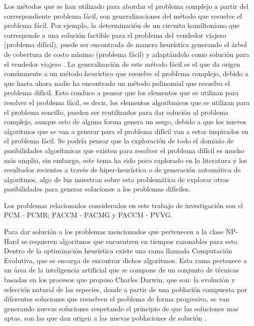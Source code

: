 Los métodos que se han utilizado para abordar el problema complejo a partir del correspondiente problema fácil, son generalizaciones del método que resuelve el problema fácil. Por ejemplo, la determinación de un circuito hamiltoniano que corresponde a una solución factible para el problema del vendedor viajero (problema difícil), puede ser encontrada de manera heurística generando el árbol de cobertura de costo mínimo (problema fácil) y adaptándolo como solución para el vendedor viajero \citep{Applegate09}. La generalización de este método fácil es el que da origen comúnmente a un método heurístico que resuelve el problema complejo, debido a que hasta ahora nadie ha encontrado un método polinomial que resuelva el problema difícil. Esto conduce a pensar que los elementos que se utilizan para resolver el problema fácil, es decir, los elementos algorítmicos que se utilizan para el problema sencillo, pueden ser reutilizados para dar solución al problema complejo, aunque esto de alguna forma genera un sesgo, debido a que los nuevos algoritmos que se van a generar para el problema difícil van a estar inspirados en el problema fácil. Se podría pensar que la exploración de todo el dominio de posibilidades algorítmicas que existen para resolver el problema difícil es mucho más amplio, sin embargo, este tema ha sido poco explorado en la literatura y los resultados recientes a través de hiper-heurística o de generación automática de algoritmos, algo de luz muestran sobre esta problemática de explorar otras posibilidades para generar soluciones a los problemas difíciles.


Los problemas relacionados considerados en este trabajo de investigación son el PCM - PCMR; PACCM - PACMG y PACCM - PVVG.

Para dar solución a los problemas mencionados que pertenecen a la clase NP-Hard se requieren algoritmos que encuentren en tiempos razonables para esto. Dentro de la optimización heurística existe una rama llamada Computación Evolutiva, que se encarga de encontrar dichos algoritmos. Esta rama pertenece a un área de la inteligencia artificial que se compone de un conjunto de técnicas basadas en los procesos que propuso Charles Darwin, que son: la evolución y selección natural de las especies, donde a partir de una población compuesta por diferentes soluciones que resuelven el problema de forma progresiva, se van generando nuevas soluciones respetando el principio de que las soluciones mas aptas, son las que dan origen a las nuevas poblaciones de solución \citep{koza1999genetic}.

